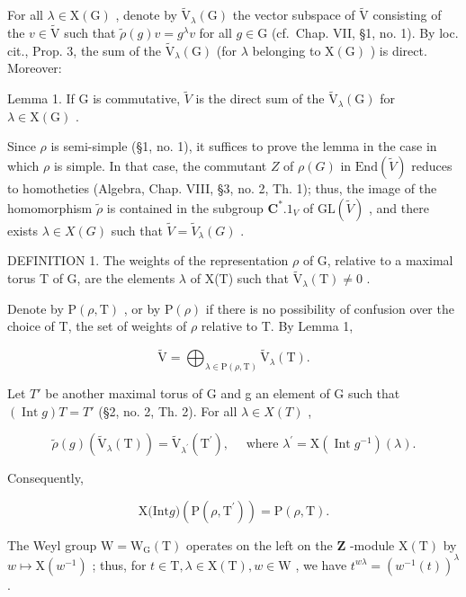 For all \(\lambda \in \mathrm{X}(\mathrm{G})\) , denote by \(\tilde{\mathrm{V}}_{\lambda}(\mathrm{G})\) the vector subspace of \(\tilde{\mathrm{V}}\) consisting of the \(v \in \tilde{\mathrm{V}}\) such that \(\tilde{\rho}(g)v = g^{\lambda}v\) for all \(g \in \mathrm{G}\) (cf.~Chap. VII, §1, no. 1). By loc. cit., Prop. 3, the sum of the \(\tilde{\mathrm{V}}_{\lambda}(\mathrm{G})\) (for \(\lambda\) belonging to \(\mathrm{X}(\mathrm{G})\) ) is direct. Moreover:

Lemma 1. If G is commutative, \(\tilde{V}\) is the direct sum of the \(\tilde{\mathrm{V}}_{\lambda}(\mathrm{G})\) for \(\lambda \in \mathrm{X}(\mathrm{G})\) .

Since \(\rho\) is semi-simple (§1, no. 1), it suffices to prove the lemma in the case in which \(\rho\) is simple. In that case, the commutant \(Z\) of \(\rho(G)\) in \(\mathrm{End}(\tilde{V})\) reduces to homotheties (Algebra, Chap. VIII, §3, no. 2, Th. 1); thus, the image of the homomorphism \(\tilde{\rho}\) is contained in the subgroup \(\mathbf{C}^*.1_V\) of \(\mathrm{GL}(\tilde{V})\) , and there exists \(\lambda \in X(G)\) such that \(\tilde{V} = \tilde{V}_{\lambda}(G)\) .

DEFINITION 1. The weights of the representation \(\rho\) of G, relative to a maximal torus T of G, are the elements \(\lambda\) of X(T) such that \(\tilde{\mathrm{V}}_{\lambda}(\mathrm{T}) \neq 0\) .

Denote by \(\mathrm{P}(\rho,\mathrm{T})\) , or by \(\mathrm{P}(\rho)\) if there is no possibility of confusion over the choice of T, the set of weights of \(\rho\) relative to T. By Lemma 1,

\[
\tilde {\mathrm{V}} = \bigoplus_ {\lambda \in \mathrm{P} (\rho , \mathrm{T})} \tilde {\mathrm{V}} _ {\lambda} (\mathrm{T}).\tag{7}
\]

Let \(T'\) be another maximal torus of G and g an element of G such that \((\operatorname{Int} g)T = T'\) (§2, no. 2, Th. 2). For all \(\lambda \in X(T)\) ,

\[
\tilde {\rho} (g) (\tilde {\mathrm{V}} _ {\lambda} (\mathrm{T})) = \tilde {\mathrm{V}} _ {\lambda^ {\prime}} (\mathrm{T} ^ {\prime}), \quad \text { where } \lambda^ {\prime} = \mathrm{X} (\operatorname{Int} g ^ {- 1}) (\lambda).\tag{8}
\]

Consequently,

\[
\mathrm{X(Int} g) (\mathrm{P} (\rho , \mathrm{T} ^ {\prime})) = \mathrm{P} (\rho , \mathrm{T}).\tag{9}
\]

The Weyl group \(\mathrm{W} = \mathrm{W}_{\mathrm{G}}(\mathrm{T})\) operates on the left on the \(\mathbf{Z}\) -module \(\mathrm{X(T)}\) by \(w\mapsto \mathrm{X}(w^{-1})\) ; thus, for \(t\in \mathrm{T},\lambda \in \mathrm{X(T)},w\in \mathrm{W}\) , we have \(t^{w\lambda} = (w^{-1}(t))^{\lambda}\) .

